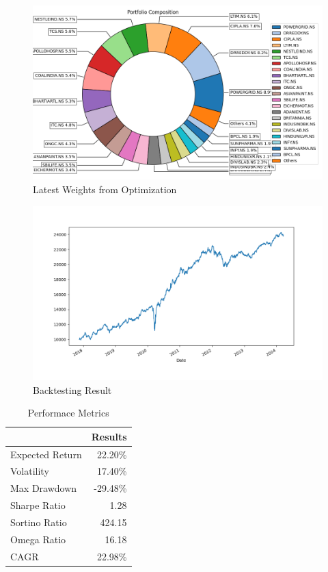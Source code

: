 \begin{figure}[H]
   \centering
   \includegraphics[width=1\linewidth]{images/Max_diver/Weights.png}
   \caption{Latest Weights from Optimization}
   \label{fig:network_architecture1}
 \end{figure}

 \begin{figure}[H]
   \centering
   \includegraphics[width=1\linewidth]{images/Max_diver/backtest.png}
   \caption{Backtesting Result}
   \label{fig:network_architecture1}
 \end{figure}

 \begin{table}[H]

    \centering %
    \label{tab:performance_metrics}
    
    \caption{Performace Metrics}
    \vspace{5mm} %

\begin{tabular}{lr}
\toprule
 & Results \\
\midrule
Expected Return & 22.20\% \\
Volatility & 17.40\% \\
Max Drawdown & -29.48\% \\
Sharpe Ratio & 1.28 \\
Sortino Ratio & 424.15 \\
Omega Ratio & 16.18 \\
CAGR & 22.98\% \\
\bottomrule
\end{tabular}
\end{table}

